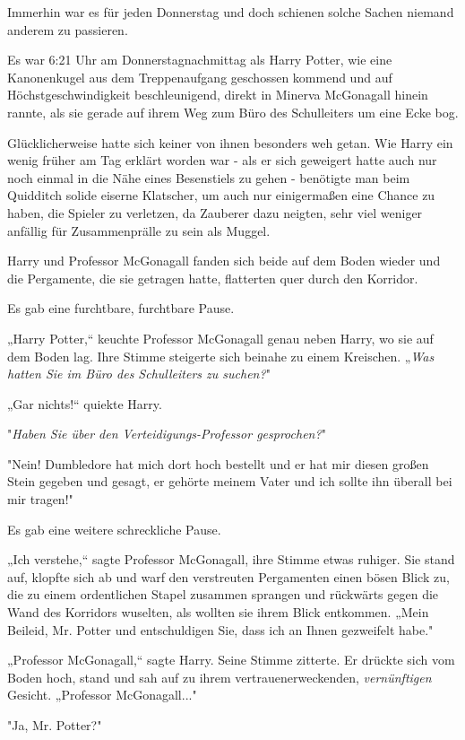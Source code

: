 {Immerhin war es für jeden Donnerstag und doch schienen solche Sachen niemand anderem zu passieren.

Es war 6:21 Uhr am Donnerstagnachmittag als Harry Potter, wie eine Kanonenkugel aus dem Treppenaufgang geschossen kommend und auf Höchstgeschwindigkeit beschleunigend, direkt in Minerva McGonagall hinein rannte, als sie gerade auf ihrem Weg zum Büro des Schulleiters um eine Ecke bog.

Glücklicherweise hatte sich keiner von ihnen besonders weh getan. Wie Harry ein wenig früher am Tag erklärt worden war - als er sich geweigert hatte auch nur noch einmal in die Nähe eines Besenstiels zu gehen - benötigte man beim Quidditch solide eiserne Klatscher, um auch nur einigermaßen eine Chance zu haben, die Spieler zu verletzen, da Zauberer dazu neigten, sehr viel weniger anfällig für Zusammenprälle zu sein als Muggel.

Harry und Professor McGonagall fanden sich beide auf dem Boden wieder und die Pergamente, die sie getragen hatte, flatterten quer durch den Korridor.

Es gab eine furchtbare, furchtbare Pause.

„Harry Potter,“ keuchte Professor McGonagall genau neben Harry, wo sie auf dem Boden lag. Ihre Stimme steigerte sich beinahe zu einem Kreischen. „\emph{Was hatten Sie im Büro des Schulleiters zu suchen?}"

„Gar nichts!“ quiekte Harry.

"\emph{Haben Sie über den Verteidigungs-Professor gesprochen?}"

"Nein! Dumbledore hat mich dort hoch bestellt und er hat mir diesen großen Stein gegeben und gesagt, er gehörte meinem Vater und ich sollte ihn überall bei mir tragen!"

Es gab eine weitere schreckliche Pause.

„Ich verstehe,“ sagte Professor McGonagall, ihre Stimme etwas ruhiger. Sie stand auf, klopfte sich ab und warf den verstreuten Pergamenten einen bösen Blick zu, die zu einem ordentlichen Stapel zusammen sprangen und rückwärts gegen die Wand des Korridors wuselten, als wollten sie ihrem Blick entkommen. „Mein Beileid, Mr. Potter und entschuldigen Sie, dass ich an Ihnen gezweifelt habe."

„Professor McGonagall,“ sagte Harry. Seine Stimme zitterte. Er drückte sich vom Boden hoch, stand und sah auf zu ihrem vertrauenerweckenden, \emph{vernünftigen} Gesicht. „Professor McGonagall..."

"Ja, Mr. Potter?"

}
